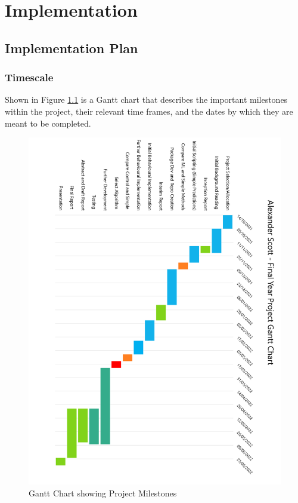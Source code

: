 \chapter{Implementation}
\label{chapter: Implement}

\section{Implementation Plan}
\subsection{Timescale}
Shown in Figure \ref{fig:timescale} is a Gantt chart that describes the important milestones within the project, their relevant time frames, and the dates by which they are meant to be completed.

\begin{figure}
    \centering
    \includegraphics{Implementation/timescale.PNG}
    \caption{Gantt Chart showing Project Milestones}
    \label{fig:timescale}
\end{figure}

